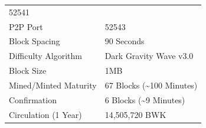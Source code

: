 \documentclass[11pt,a4paperpaper,]{report}
\begin{document}
\begin{longtable}[]{@{}ll@{}}
\begin{minipage}[t]{0.59\columnwidth}
52541\strut
\end{minipage}\tabularnewline
\begin{minipage}[t]{0.35\columnwidth}\raggedright\strut
P2P Port\strut
\end{minipage} & \begin{minipage}[t]{0.59\columnwidth}\raggedright\strut
52543\strut
\end{minipage}\tabularnewline
\begin{minipage}[t]{0.35\columnwidth}\raggedright\strut
Block Spacing\strut
\end{minipage} & \begin{minipage}[t]{0.59\columnwidth}\raggedright\strut
90 Seconds\strut
\end{minipage}\tabularnewline
\begin{minipage}[t]{0.35\columnwidth}\raggedright\strut
Difficulty Algorithm\strut
\end{minipage} & \begin{minipage}[t]{0.59\columnwidth}\raggedright\strut
Dark Gravity Wave v3.0\strut
\end{minipage}\tabularnewline
\begin{minipage}[t]{0.35\columnwidth}\raggedright\strut
Block Size\strut
\end{minipage} & \begin{minipage}[t]{0.59\columnwidth}\raggedright\strut
1MB\strut
\end{minipage}\tabularnewline
\begin{minipage}[t]{0.35\columnwidth}\raggedright\strut
Mined/Minted Maturity\strut
\end{minipage} & \begin{minipage}[t]{0.59\columnwidth}\raggedright\strut
67 Blocks (\textasciitilde{}100 Minutes)\strut
\end{minipage}\tabularnewline
\begin{minipage}[t]{0.35\columnwidth}\raggedright\strut
Confirmation\strut
\end{minipage} & \begin{minipage}[t]{0.59\columnwidth}\raggedright\strut
6 Blocks (\textasciitilde{}9 Minutes)\strut
\end{minipage}\tabularnewline
\begin{minipage}[t]{0.35\columnwidth}\raggedright\strut
Circulation (1 Year)\strut
\end{minipage} & \begin{minipage}[t]{0.59\columnwidth}\raggedright\strut
14,505,720 BWK\strut
\end{minipage}\tabularnewline

\end{longtable}
\end{document}
